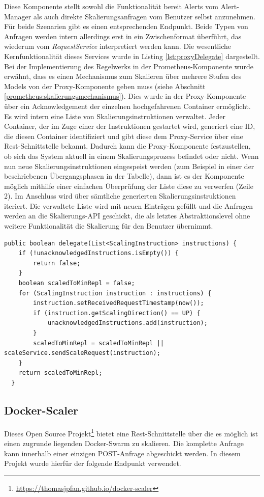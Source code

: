 Diese Komponente stellt sowohl die Funktionalität bereit Alerts vom Alert-Manager als auch direkte Skalierungsanfragen vom Benutzer selbst anzunehmen. Für beide Szenarien gibt es einen entsprechenden Endpunkt. Beide Typen von Anfragen werden intern allerdings erst in ein Zwischenformat überführt, das wiederum vom \emph{RequestService} interpretiert werden kann. Die wesentliche Kernfunktionalität dieses Services wurde in Listing \ref{lst:proxyDelegate} dargestellt. Bei der Implementierung des Regelwerks in der Prometheus-Komponente wurde erwähnt, dass es einen Mechanismus zum Skalieren über mehrere Stufen des Models von der Proxy-Komponente geben muss (siehe Abschnitt \ref{prometheus:skalierungsmechanismus}). Dies wurde in der Proxy-Komponente über ein Acknowledgement der einzelnen hochgefahrenen Container ermöglicht. Es wird intern eine Liste von Skalierungsinstruktionen verwaltet. Jeder Container, der im Zuge einer der Instruktionen gestartet wird, generiert eine ID, die diesen Container identifiziert und gibt diese dem Proxy-Service über eine Rest-Schnittstelle bekannt. Dadurch kann die Proxy-Komponente festzustellen, ob sich das System aktuell in einem Skalierungsprozess befindet oder nicht. Wenn nun neue Skalierungsinstruktionen eingespeist werden (zum Beispiel in einer der beschriebenen Übergangsphasen in der Tabelle), dann ist es der Komponente möglich mithilfe einer einfachen Überprüfung der Liste diese zu verwerfen (Zeile 2). Im Anschluss wird über sämtliche generierten Skalierungsinstruktionen iteriert. Die verwaltete Liste wird mit neuen Einträgen gefüllt und die Anfragen werden an die Skalierungs-API geschickt, die als letztes Abstraktionslevel ohne weitere Funktionalität die Skalierung für den Benutzer übernimmt. 

\begin{lstlisting}[style=javaStyle,caption={Proxy Scaler - RequestService},label=lst:proxyDelegate]
  public boolean delegate(List<ScalingInstruction> instructions) {
    if (!unacknowledgedInstructions.isEmpty()) {
        return false;
    }
    boolean scaledToMinRepl = false;
    for (ScalingInstruction instruction : instructions) {
        instruction.setReceivedRequestTimestamp(now());
        if (instruction.getScalingDirection() == UP) {
            unacknowledgedInstructions.add(instruction);
        }
        scaledToMinRepl = scaledToMinRepl || scaleService.sendScaleRequest(instruction);
    }
    return scaledToMinRepl;
  }
\end{lstlisting}


\subsection{Docker-Scaler \checkmark}
Dieses Open Source Projekt\footnote{\url{https://thomasjpfan.github.io/docker-scaler}} bietet eine Rest-Schnittstelle über die es möglich ist einen zugrunde liegenden Docker-Swarm zu skalieren. Die komplette Anfrage kann innerhalb einer einzigen POST-Anfrage abgeschickt werden. In diesem Projekt wurde hierfür der folgende Endpunkt verwendet.

